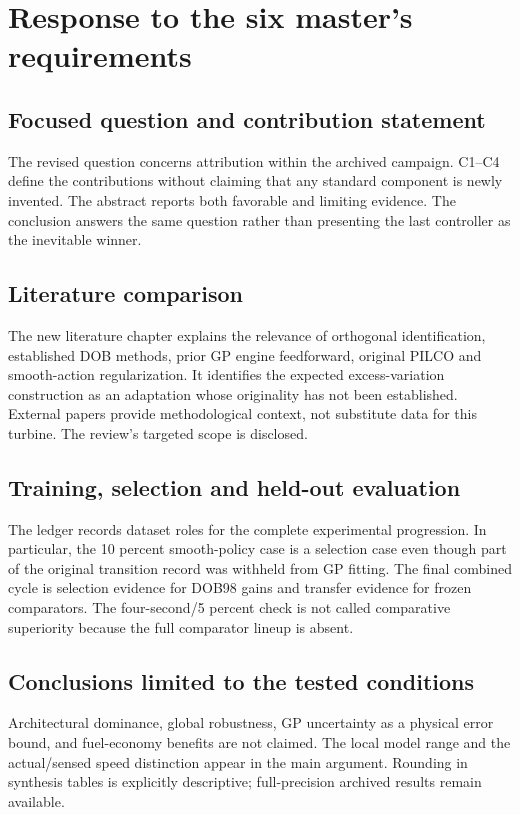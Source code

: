 \section{Response to the six master's requirements}
\subsection{Focused question and contribution statement}
The revised question concerns attribution within the archived campaign. C1--C4 define the contributions without claiming that any standard component is newly invented. The abstract reports both favorable and limiting evidence. The conclusion answers the same question rather than presenting the last controller as the inevitable winner.

\subsection{Literature comparison}
The new literature chapter explains the relevance of orthogonal identification, established DOB methods, prior GP engine feedforward, original PILCO and smooth-action regularization. It identifies the expected excess-variation construction as an adaptation whose originality has not been established. External papers provide methodological context, not substitute data for this turbine. The review's targeted scope is disclosed.

\subsection{Training, selection and held-out evaluation}
The ledger records dataset roles for the complete experimental progression. In particular, the 10 percent smooth-policy case is a selection case even though part of the original transition record was withheld from GP fitting. The final combined cycle is selection evidence for DOB98 gains and transfer evidence for frozen comparators. The four-second/5 percent check is not called comparative superiority because the full comparator lineup is absent.

\subsection{Conclusions limited to the tested conditions}
Architectural dominance, global robustness, GP uncertainty as a physical error bound, and fuel-economy benefits are not claimed. The local model range and the actual/sensed speed distinction appear in the main argument. Rounding in synthesis tables is explicitly descriptive; full-precision archived results remain available.

